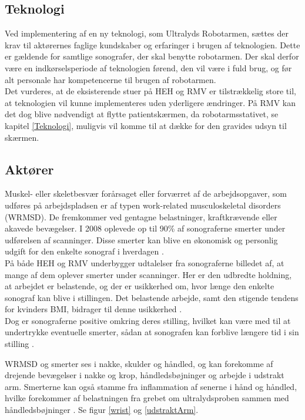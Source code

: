 \subsection{Teknologi}
Ved implementering af en ny teknologi, som Ultralyds Robotarmen, sættes der krav til aktørernes faglige kundskaber og erfaringer i brugen af teknologien. Dette er gældende for samtlige sonografer, der skal benytte robotarmen. Der skal derfor være en indkørselsperiode af teknologien førend, den vil være i fuld brug, og før alt personale har kompetencerne til brugen af robotarmen. \\
Det vurderes, at de eksisterende stuer på HEH og RMV er tilstrækkelig store til, at teknologien vil kunne implementeres uden yderligere ændringer. På RMV kan det dog blive nødvendigt at flytte patientskærmen, da robotarmsstativet, se kapitel \ref{Teknologi}, muligvis vil komme til at dække for den gravides udsyn til skærmen.  

\subsection{Aktører} \label{aktoerer_organisation}
Muskel- eller skeletbesvær forårsaget eller forværret af de arbejdsopgaver, som udføres på arbejdspladsen er af typen work-related musculoskeletal disorders (WRMSD). De fremkommer ved gentagne belastninger, kraftkrævende eller akavede bevægelser. I 2008 oplevede op til 90\% af sonograferne smerter under udførelsen af scanninger. Disse smerter kan blive en økonomisk og personlig udgift for den enkelte sonograf i hverdagen \cite{31}\cite{30}\citep{24}\cite{36}.\\
På både HEH og RMV underbygger udtalelser fra sonograferne billedet af, at mange af dem oplever smerter under scanninger. 
Her er den udbredte holdning, at arbejdet er belastende, og der er usikkerhed om, hvor længe den enkelte sonograf kan blive i stillingen. Det belastende arbejde, samt den stigende tendens for kvinders BMI, bidrager til denne usikkerhed \cite{kvinderovervaegt}\cite{31}\cite{24}. \\
Dog er sonograferne positive omkring deres stilling, hvilket kan være med til at undertrykke eventuelle smerter, sådan at sonografen kan forblive længere tid i sin stilling \cite{1}\cite{24}.

WRMSD og smerter ses i nakke, skulder og håndled, og kan forekomme af drejende bevægelser i nakke og krop, håndledsbøjninger og arbejde i udstrakt arm. Smerterne kan også stamme fra inflammation af senerne i hånd og håndled, hvilke forekommer af belastningen fra grebet om ultralydsproben sammen med håndledsbøjninger \cite{31}\cite{24}\cite{36}\cite{32}. Se figur \ref{wrist} og \ref{udstraktArm}.

